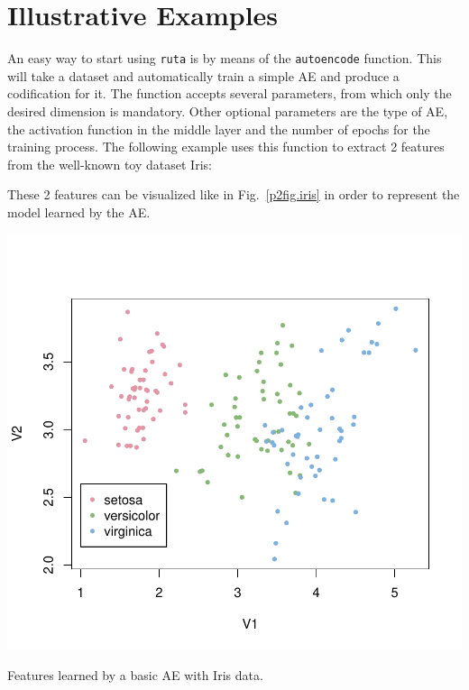 
\section{Illustrative Examples}
\label{p2sec.examples}


An easy way to start using \texttt{ruta} is by means of the \texttt{autoencode} function. This will take a dataset and  automatically train a simple AE and produce a codification for it. The function accepts several parameters, from which only the desired dimension is mandatory. Other optional parameters are the type of AE, the activation function in the middle layer and the number of epochs for the training process. The following example uses this function to extract 2 features from the well-known toy dataset Iris:



These 2 features can be visualized like in Fig.~\ref{p2fig.iris} in order to represent the model learned by the AE.

\begin{marginfigure}
  \centering
  \includegraphics[width=\textwidth]{iris.pdf}
  \caption{Features learned by a basic AE with Iris data.}
  \label{p2fig.iris}
\end{marginfigure}

